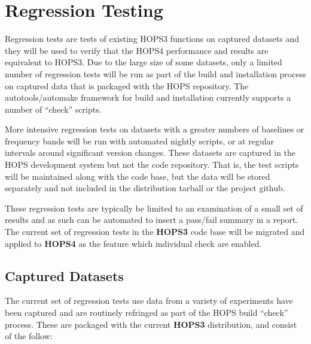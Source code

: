 %
\section{Regression Testing}
\label{sec:regress}

Regression tests are tests of existing HOPS3 functions on captured datasets and they will be used to verify that the HOPS4 performance and results are equivalent to HOPS3.  Due to the large size of some datasets, only a limited number of regression tests will be run as part of the build and installation process on captured data that is packaged with the HOPS repository.  The autotools/automake framework for build and installation currently supports a number of ``check'' scripts.

More intensive regression tests on datasets with a greater numbers of baselines or frequency bands will  be run with automated nightly scripts, or at regular intervals around significant version changes. These datasets are captured in the \ac{HOPS} development system but not the code repository.  That is, the test scripts will be maintained along with the code base, but the data will be stored separately and not included in the distribution tarball or the project github.

These regression tests are typically be limited to an examination of a small set of results and as such can be automated to insert a pass/fail summary in a report.
The current set of regression tests in the \textbf{HOPS3} code base will be migrated and applied to \textbf{HOPS4} as the feature which individual check are enabled. 



\subsection{Captured Datasets}
\label{sec:captdatareq}

The current set of regression tests use data from a variety of experiments have been captured and are routinely refringed as part of the HOPS build ``check'' process.  
These are packaged with the current \textbf{HOPS3} distribution, and consist of the follow:


